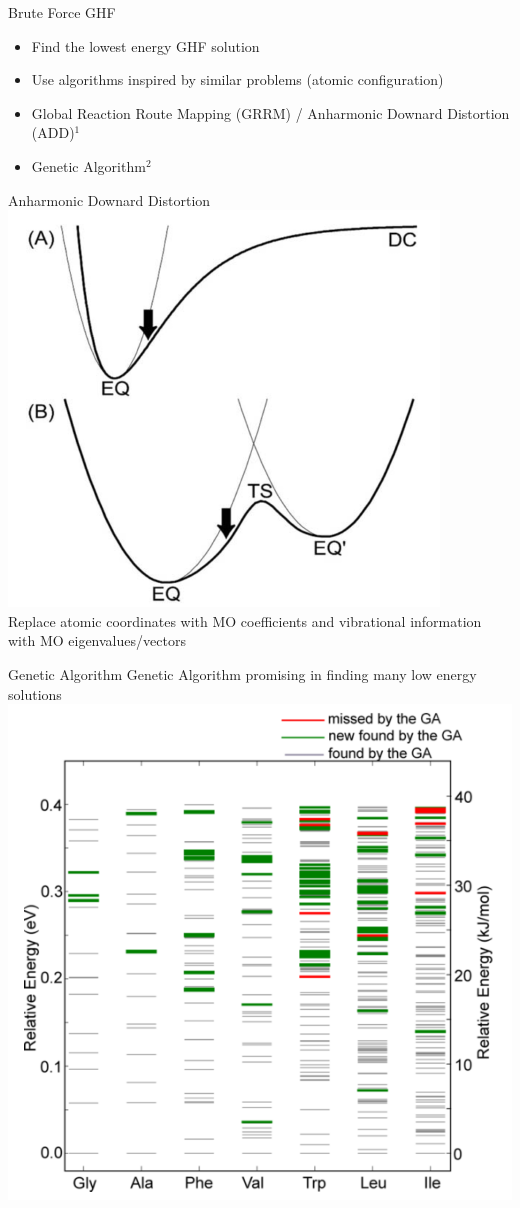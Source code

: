 \documentclass[10pt]{beamer}
\begin{document}
{{{{{{{{{{
\begin{frame}{Brute Force GHF}
	\begin{itemize}[<+->]
  	\item Find the lowest energy GHF solution 
  	\item Use algorithms inspired by similar problems (atomic configuration)
  	\item Global Reaction Route Mapping (GRRM) / Anharmonic Downard Distortion (ADD)$^1$
  	\item Genetic Algorithm$^2$
	\end{itemize}
\end{frame}

\begin{frame}{Anharmonic Downard Distortion}
  \centering
	\includegraphics[width=.6\linewidth]{../figures/ADD.png}\\
	Replace atomic coordinates with MO coefficients and vibrational information with MO 
	eigenvalues/vectors
\end{frame}

\begin{frame}{Genetic Algorithm}
  \centering
  Genetic Algorithm promising in finding many low energy solutions
	\includegraphics[width=.6\linewidth]{../figures/GA_supady.png}
\end{frame}

}}}}}}}}}}
\end{document}
